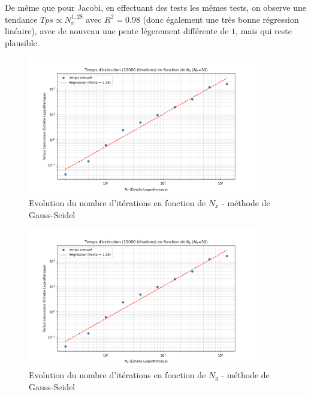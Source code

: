 \documentclass{article}
\begin{document}
De même que pour Jacobi, en effectuant des tests les mêmes tests, on observe une tendance $Tps \propto N_x^{1,28}$ avec $R^2=0.98$ (donc également une très bonne régression linéaire), avec de nouveau une pente légerement différente de $1$, mais qui reste plausible.

\begin{figure}[H]
    \centering
    \includegraphics[width=0.9\textwidth]{courbe_log_log_gs.png}
    \caption{Evolution du nombre d'itérations en fonction de $N_x$ - méthode de Gauss-Seidel}
    \label{fig:loglogGS}
\end{figure}

\begin{figure}[H]
    \centering
    \includegraphics[width=0.9\textwidth]{courbe_log_log_gs_Ny.png}
    \caption{Evolution du nombre d'itérations en fonction de $N_y$ - méthode de Gauss-Seidel}
    \label{fig:loglogGSNy}
\end{figure}
\end{document}
